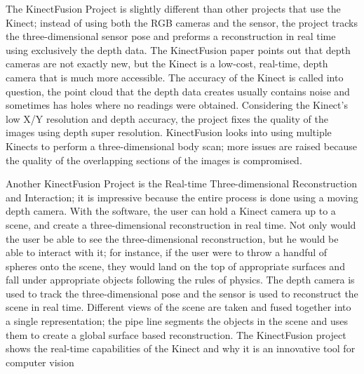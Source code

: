 \documentclass[pdftex,10.5pt]{report}
\begin{document}
The KinectFusion Project is slightly different than other projects that use the Kinect; instead of using both the RGB cameras and the sensor, the project tracks the three-dimensional sensor pose and preforms a reconstruction in real time using exclusively the depth data. The KinectFusion paper points out that depth cameras are not exactly new, but the Kinect is a low-cost, real-time, depth camera that is much more accessible. The accuracy of the Kinect is called into question, the point cloud that the depth data creates usually contains noise and sometimes has holes where no readings were obtained. Considering the Kinect's low X/Y resolution and depth accuracy, the project fixes the quality of the images using depth super resolution. KinectFusion looks into using multiple Kinects to perform a three-dimensional body scan; more issues are raised because the quality of the overlapping sections of the images is compromised.

Another KinectFusion Project is the Real-time Three-dimensional Reconstruction and Interaction; it is impressive because the entire process is done using a moving depth camera. With the software, the user can hold a Kinect camera up to a scene, and create a three-dimensional reconstruction in real time. Not only would the user be able to see the three-dimensional reconstruction, but he would be able to interact with it; for instance, if the user were to throw a handful of spheres onto the scene, they would land on the top of appropriate surfaces and fall under appropriate objects following the rules of physics. The depth camera is used to track the three-dimensional pose and the sensor is used to reconstruct the scene in real time. Different views of the scene are taken and fused together into a single representation; the pipe line segments the objects in the scene and uses them to create a global surface based reconstruction. The KinectFusion project shows the real-time capabilities of the Kinect and why it is an innovative tool for computer vision
\end{document}
